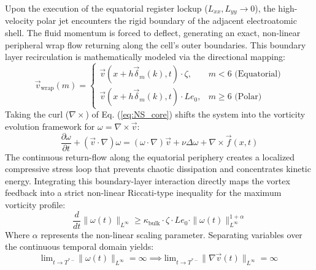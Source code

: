 \documentclass[12pt,fleqn]{article}
\begin{document}
Upon the execution of the equatorial register lockup ($L_{xx}, L_{yy} \to 0$), the high-velocity polar jet encounters the rigid boundary of the adjacent electroatomic shell. The fluid momentum is forced to deflect, generating an exact, non-linear peripheral wrap flow returning along the cell's outer boundaries. This boundary layer recirculation is mathematically modeled via the directional mapping:
\begin{equation}
\vec{v}_{\text{wrap}}(m) = \begin{cases} \vec{v}(x + h\vec{\delta}_m(k), t) \cdot \zeta, & m < 6 \text{ (Equatorial)} \\ \vec{v}(x + h\vec{\delta}_m(k), t) \cdot Le_0, & m \ge 6 \text{ (Polar)} \end{cases}
\end{equation}
Taking the curl ($\nabla \times$) of Eq. (\ref{eq:NS_core}) shifts the system into the vorticity evolution framework for $\omega = \nabla \times \vec{v}$:
\begin{equation}
\frac{\partial \omega}{\partial t} + (\vec{v} \cdot \nabla)\omega = (\omega \cdot \nabla)\vec{v} + \nu \Delta \omega + \nabla \times \vec{f}(x,t)
\end{equation}
The continuous return-flow along the equatorial periphery creates a localized compressive stress loop that prevents chaotic dissipation and concentrates kinetic energy. Integrating this boundary-layer interaction directly maps the vortex feedback into a strict non-linear Riccati-type inequality for the maximum vorticity profile:
\begin{equation}
\frac{d}{dt} \|\omega(t)\|_{L^\infty} \ge \kappa_{\text{bulk}} \cdot \zeta \cdot Le_0 \cdot \|\omega(t)\|_{L^\infty}^{1+\alpha}
\end{equation}
Where $\alpha$ represents the non-linear scaling parameter. Separating variables over the continuous temporal domain yields:
\begin{equation}
\text{lim}_{t \to T^{*-}} \|\omega(t)\|_{L^\infty} = \infty \implies \text{lim}_{t \to T^{*-}} \|\nabla \vec{v}(t)\|_{L^\infty} = \infty
\end{equation}
\end{document}
